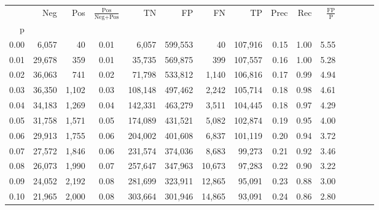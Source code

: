 \begin{tabular}{rrrcrrrrrrrrrrr}
\toprule
{} &     Neg &    Pos & $\frac{\text{Pos}}{\text{Neg}+\text{Pos}}$ &       TN &       FP &       FN &       TP &  Prec &   Rec & $\frac{\text{FP}}{\text{P}}$ \\
p    &         &        &                                            &          &          &          &          &       &       &                              \\
\midrule
0.00 &   6,057 &     40 &                                       0.01 &    6,057 &  599,553 &       40 &  107,916 &  0.15 &  1.00 &                         5.55 \\
0.01 &  29,678 &    359 &                                       0.01 &   35,735 &  569,875 &      399 &  107,557 &  0.16 &  1.00 &                         5.28 \\
0.02 &  36,063 &    741 &                                       0.02 &   71,798 &  533,812 &    1,140 &  106,816 &  0.17 &  0.99 &                         4.94 \\
0.03 &  36,350 &  1,102 &                                       0.03 &  108,148 &  497,462 &    2,242 &  105,714 &  0.18 &  0.98 &                         4.61 \\
0.04 &  34,183 &  1,269 &                                       0.04 &  142,331 &  463,279 &    3,511 &  104,445 &  0.18 &  0.97 &                         4.29 \\
0.05 &  31,758 &  1,571 &                                       0.05 &  174,089 &  431,521 &    5,082 &  102,874 &  0.19 &  0.95 &                         4.00 \\
0.06 &  29,913 &  1,755 &                                       0.06 &  204,002 &  401,608 &    6,837 &  101,119 &  0.20 &  0.94 &                         3.72 \\
0.07 &  27,572 &  1,846 &                                       0.06 &  231,574 &  374,036 &    8,683 &   99,273 &  0.21 &  0.92 &                         3.46 \\
0.08 &  26,073 &  1,990 &                                       0.07 &  257,647 &  347,963 &   10,673 &   97,283 &  0.22 &  0.90 &                         3.22 \\
0.09 &  24,052 &  2,192 &                                       0.08 &  281,699 &  323,911 &   12,865 &   95,091 &  0.23 &  0.88 &                         3.00 \\
0.10 &  21,965 &  2,000 &                                       0.08 &  303,664 &  301,946 &   14,865 &   93,091 &  0.24 &  0.86 &                         2.80 \\

\end{tabular}
